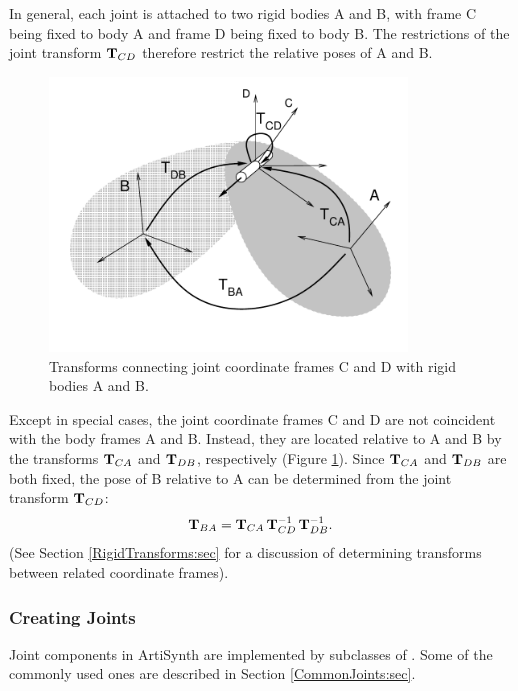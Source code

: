 In general, each joint is attached to two rigid bodies A and B, with
frame C being fixed to body A and frame D being fixed to body B. The
restrictions of the joint transform ${\bf T}_{CD}$ therefore restrict the
relative poses of A and B.

\begin{figure}[ht]
\begin{center}
 \includegraphics[width=3.74in]{images/jointBodyFrames}
\end{center}
\caption{Transforms connecting joint coordinate frames C and D with
rigid bodies A and B.}
\label{jointBodyFrames:fig}
\end{figure}

Except in special cases, the joint coordinate frames C and D are not
coincident with the body frames A and B.  Instead, they are located
relative to A and B by the transforms ${\bf T}_{CA}$ and ${\bf T}_{DB}$,
respectively (Figure \ref{jointBodyFrames:fig}). 
Since ${\bf T}_{CA}$ and ${\bf T}_{DB}$ are both fixed, the pose
of B relative to A can be determined from
the joint transform ${\bf T}_{CD}$:
%
\begin{equation}
{\bf T}_{BA} = {\bf T}_{CA} \, {\bf T}_{CD}^{-1} \, {\bf T}_{DB}^{-1}.
\label{jointPose:eqn}
\end{equation}
%
(See Section \ref{RigidTransforms:sec} for a discussion of determining
transforms between related coordinate frames).

\subsubsection{Creating Joints}
\label{CreatingJoints:sec}

Joint components in ArtiSynth are implemented by subclasses of
.  Some of
the commonly used ones are described in Section
\ref{CommonJoints:sec}.

